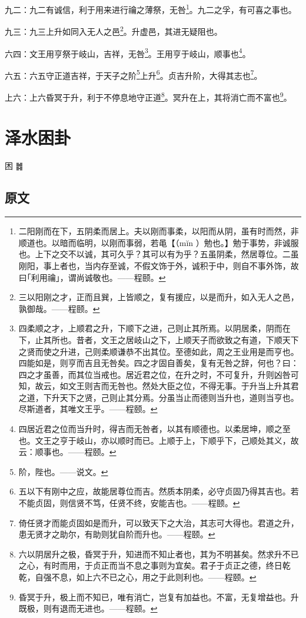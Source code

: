 \documentclass[12pt,oneside]{book}
\begin{document}
九二：九二有诚信，利于用来进行禴之薄祭，无咎\footnote{二阳刚而在下，五阴柔而居上。夫以刚而事柔，以阳而从阴，虽有时而然，非顺道也。以暗而临明，以刚而事弱，若黾【（mĭn ）勉也。】勉于事势，非诚服也。上下之交不以诚，其可久乎？其可以有为乎？五虽阴柔，然居尊位。二虽刚阳，事上者也，当内存至诚，不假文饰于外，诚积于中，则自不事外饰，故曰｢利用禴｣，谓尚诚敬也。——程颐。}。九二之孚，有可喜之事也。

九三：九三上升如同入无人之邑\footnote{三以阳刚之才，正而且巽，上皆顺之，复有援应，以是而升，如入无人之邑，孰御哉。——程颐。}。升虚邑，其进无疑阻也。

六四：文王用亨祭于岐山，吉祥，无咎\footnote{四柔顺之才，上顺君之升，下顺下之进，己则止其所焉。以阴居柔，阴而在下，止其所也。昔者，文王之居岐山之下，上顺天子而欲致之有道，下顺天下之贤而使之升进，己则柔顺谦恭不出其位。至德如此，周之王业用是而亨也。四能如是，则亨而吉且无咎矣。四之才固自善矣，复有无咎之辞，何也？曰：四之才虽善，而其位当戒也。居近君之位，在升之时，不可复升，升则凶咎可知，故云，如文王则吉而无咎也。然处大臣之位，不得无事。于升当上升其君之道，下升天下之贤，己则止其分焉。分虽当止而德则当升也，道则当亨也。尽斯道者，其唯文王乎。——程颐。}。王用亨于岐山，顺事也\footnote{四居近君之位而当升时，得吉而无咎者，以其有顺德也。以柔居坤，顺之至也。文王之亨于岐山，亦以顺时而已。上顺于上，下顺乎下，己顺处其义，故云：顺事也。——程颐。}。

六五：六五守正道吉祥，于天子之阶\footnote{阶，陛也。——说文。}上升\footnote{五以下有刚中之应，故能居尊位而吉。然质本阴柔，必守贞固乃得其吉也。若不能贞固，则信贤不笃，任贤不终，安能吉也。——程颐。}。贞吉升阶，大得其志也\footnote{倚任贤才而能贞固如是而升，可以致天下之大治，其志可大得也。君道之升，患无贤才之助尔，有助则犹自阶而升也。——程颐。}。

上六：上六昏冥于升，利于不停息地守正道\footnote{六以阴居升之极，昏冥于升，知进而不知止者也，其为不明甚矣。然求升不已之心，有时而用，于贞正而当不息之事则为宜矣。君子于贞正之德，终日乾乾，自强不息，如上六不已之心，用之于此则利也。——程颐。}。冥升在上，其将消亡而不富也\footnote{昏冥于升，极上而不知已，唯有消亡，岂复有加益也。不富，无复增益也。升既极，则有退而无进也。——程颐。}。


\chapter{泽水困卦}
困 {\Large ䷮}

\section{原文}
\end{document}
